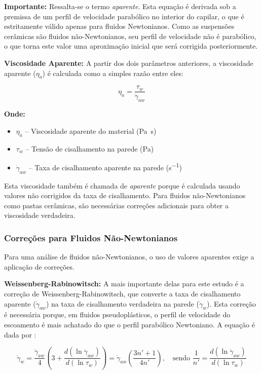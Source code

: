 \documentclass[a4paper,12pt]{article}
\begin{document}
\textbf{Importante:} Ressalta-se o termo \textit{aparente}. Esta equação é derivada sob a premissa de um perfil de velocidade parabólico no interior do capilar, o que é estritamente válido apenas para fluidos Newtonianos. Como as suspensões cerâmicas são fluidos não-Newtonianos, seu perfil de velocidade não é parabólico, o que torna este valor uma aproximação inicial que será corrigida posteriormente.

\vspace{1em}
\textbf{Viscosidade Aparente:} A partir dos dois parâmetros anteriores, a viscosidade aparente ($\eta_a$) é calculada como a simples razão entre eles:

\begin{equation}
    \eta_a = \frac{\tau_w}{\dot{\gamma}_{aw}}
\end{equation}

\textbf{Onde:}
\begin{itemize}[leftmargin=1.5em]
  \item $\eta_a$ -- Viscosidade aparente do material (\si{Pa.s})
  \item $\tau_w$ -- Tensão de cisalhamento na parede (\si{Pa})
  \item $\dot{\gamma}_{aw}$ -- Taxa de cisalhamento aparente na parede (\si{s^{-1}})
\end{itemize}

Esta viscosidade também é chamada de \textit{aparente} porque é calculada usando valores não corrigidos da taxa de cisalhamento. Para fluidos não-Newtonianos como pastas cerâmicas, são necessárias correções adicionais para obter a viscosidade verdadeira.

\subsubsection*{Correções para Fluidos Não-Newtonianos}
Para uma análise de fluidos não-Newtonianos, o uso de valores aparentes exige a aplicação de correções.

\textbf{Weissenberg-Rabinowitsch:} A mais importante delas para este estudo é a correção de Weissenberg-Rabinowitsch, que converte a taxa de cisalhamento aparente ($\dot{\gamma}_{aw}$) na taxa de cisalhamento verdadeira na parede ($\dot{\gamma}_w$). Esta correção é necessária porque, em fluidos pseudoplásticos, o perfil de velocidade do escoamento é mais achatado do que o perfil parabólico Newtoniano. A equação é dada por \cite{barnes1989}:

\begin{equation}
    \dot{\gamma}_w = \frac{\dot{\gamma}_{aw}}{4} \left( 3 + \frac{d(\ln \dot{\gamma}_{aw})}{d(\ln \tau_w)} \right) = \dot{\gamma}_{aw} \left( \frac{3n' + 1}{4n'} \right), \quad \text{sendo } \frac{1}{n'} = \frac{d(\ln \dot{\gamma}_{aw})}{d(\ln \tau_w)}
\end{equation}
\end{document}
